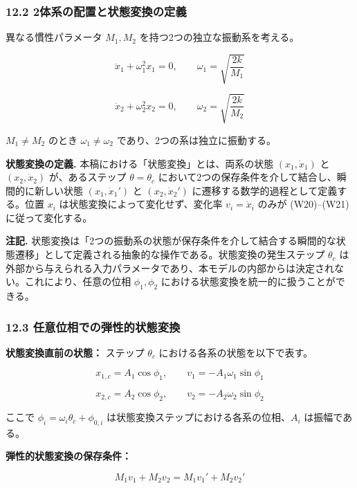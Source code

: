 \documentclass[a4paper,11pt]{ltjsarticle}
\begin{document}
\subsubsection{12.2
2体系の配置と状態変換の定義}\label{ux4f53ux7cfbux306eux914dux7f6eux3068ux72b6ux614bux5909ux63dbux306eux5b9aux7fa9}

異なる慣性パラメータ \(M_1, M_2\) を持つ2つの独立な振動系を考える。

\[\ddot{x}_1 + \omega_1^2 x_1 = 0, \qquad \omega_1 = \sqrt{\frac{2k}{M_1}} \tag{W14}\]

\[\ddot{x}_2 + \omega_2^2 x_2 = 0, \qquad \omega_2 = \sqrt{\frac{2k}{M_2}} \tag{W15}\]

\(M_1 \neq M_2\) のとき \(\omega_1 \neq \omega_2\)
であり、2つの系は独立に振動する。

\textbf{状態変換の定義.} 本稿における「状態変換」とは、両系の状態
\((x_1, \dot{x}_1)\) と \((x_2, \dot{x}_2)\) が、あるステップ
\(\theta = \theta_c\)
において2つの保存条件を介して結合し、瞬間的に新しい状態
\((x_1, \dot{x}_1')\) と \((x_2, \dot{x}_2')\)
に遷移する数学的過程として定義する。位置 \(x_i\)
は状態変換によって変化せず、変化率 \(v_i = \dot{x}_i\) のみが
(W20)--(W21) に従って変化する。

\textbf{注記.}
状態変換は「2つの振動系の状態が保存条件を介して結合する瞬間的な状態遷移」として定義される抽象的な操作である。状態変換の発生ステップ
\(\theta_c\)
は外部から与えられる入力パラメータであり、本モデルの内部からは決定されない。これにより、任意の位相
\(\phi_1, \phi_2\) における状態変換を統一的に扱うことができる。

\subsubsection{12.3
任意位相での弾性的状態変換}\label{ux4efbux610fux4f4dux76f8ux3067ux306eux5f3eux6027ux7684ux72b6ux614bux5909ux63db}

\textbf{状態変換直前の状態：} ステップ \(\theta_c\)
における各系の状態を以下で表す。

\[x_{1,c} = A_1\cos\phi_1, \qquad v_1 = -A_1\omega_1\sin\phi_1 \tag{W16}\]

\[x_{2,c} = A_2\cos\phi_2, \qquad v_2 = -A_2\omega_2\sin\phi_2 \tag{W17}\]

ここで \(\phi_i = \omega_i\theta_c + \phi_{0,i}\)
は状態変換ステップにおける各系の位相、\(A_i\) は振幅である。

\textbf{弾性的状態変換の保存条件：}

\[M_1 v_1 + M_2 v_2 = M_1 v_1' + M_2 v_2' \tag{W18}\]
\end{document}
